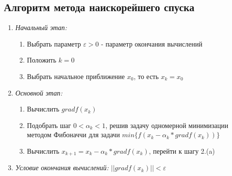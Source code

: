 \documentclass[../body.tex]{subfiles}
\begin{document}
\subsection{Алгоритм метода наискорейшего спуска}
\begin{enumerate}
    \item \textit{Начальный этап:}
        \begin{enumerate}
            \item Выбрать параметр $\varepsilon>0$ - параметр окончания вычислений
            \item Положить $k=0$
            \item Выбрать начальное приближение $x_0$, то есть $x_k=x_0$
        \end{enumerate}
    \item \textit{Основной этап:}
        \begin{enumerate}
            \item Вычислить $grad f(x_k)$
            \item Подобрать шаг $0<\alpha_k<1$, решив задачу одномерной минимизации методом Фибоначчи для задачи $min{\{f(x_k-\alpha_k*grad f(x_k))\}}$
            \item Вычислить $x_{k+1}=x_k-\alpha_k*grad f(x_k)$, перейти к шагу 2.(a)
        \end{enumerate}
    \item \textit{Условие окончания вычислений:} $||grad f(x_k)||<\varepsilon$
\end{enumerate}
\end{document}

